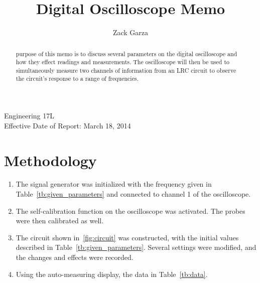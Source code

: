 \documentclass[twocolumn,english]{IEEEtran}
\theoremstyle{plain}
\theoremstyle{plain}
\begin{document}
\title{Digital Oscilloscope Memo}


\author{Zack Garza}


\IEEEspecialpapernotice
{Engineering 17L\\
Effective Date of Report: March 18, 2014}


\maketitle
\begin{abstract}
 purpose of this memo is to discuss several parameters on the digital oscilloscope and how they effect readings and measurements. The oscilloscope will then be used to simultaneously measure two channels of information from an LRC circuit to observe the circuit's response to a range of frequencies.
\end{abstract}

\tableofcontents

\section{Methodology}
\begin{enumerate}
 \item The signal generator was initialized with the frequency given in Table~\ref{tb:given_parameters} and connected to channel 1 of the oscilloscope.
 \item The self-calibration function on the oscilloscope was activated. The probes were then calibrated as well.
 \item The circuit shown in~\ref{fig:circuit} was constructed, with the initial values described in Table~\ref{tb:given_parameters}. Several settings were modified, and the changes and effects were recorded.
 \item Using the auto-measuring display, the data in Table~\ref{tb:data}.
\end{enumerate}
\end{document}
